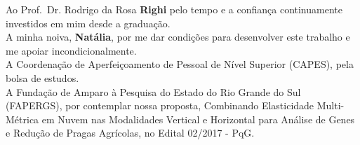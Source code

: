 \documentclass[english,brazilian]{UNISINOSmonografia} %
\begin{document}


\capa
\folhaderosto
\folhadeaprovacao %

%

\begin{agradecimentos}
	
	
	Ao Prof.~Dr. Rodrigo da Rosa \textbf{Righi} pelo tempo e a confiança continuamente investidos em mim desde a graduação.
	\\[1ex]
	
	A minha noiva, \textbf{Natália}, por me dar condições para desenvolver este trabalho e me apoiar incondicionalmente.
	\\[1ex]
	
	A Coordenação de Aperfeiçoamento de Pessoal de Nível Superior (CAPES), pela bolsa de estudos.
	\\[1ex]

	A Fundação de Amparo à Pesquisa do Estado do Rio Grande do Sul (FAPERGS), por contemplar nossa proposta, Combinando Elasticidade Multi-Métrica em Nuvem nas Modalidades Vertical e Horizontal para Análise de Genes e Redução de Pragas Agrícolas, no Edital 02/2017 - PqG.

\end{agradecimentos}

%
\end{document}
